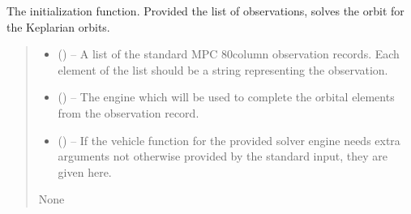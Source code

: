 \documentclass[letterpaper,11pt,english]{sphinxmanual}
\begin{document}
\begin{savenotes}
\begin{fulllineitems}
\begin{savenotes}\begin{fulllineitems}
\label{\detokenize{code/opihiexarata.orbit.solution:opihiexarata.orbit.solution.OrbitalSolution.__init__}}
\pysigstartsignatures
{}
\pysigstopsignatures
\sphinxAtStartPar
The initialization function. Provided the list of observations,
solves the orbit for the Keplarian orbits.
\begin{quote}\begin{description}
\begin{itemize}
\item {} 
\sphinxAtStartPar
{} () – A list of the standard MPC 80\sphinxhyphen{}column observation records. Each
element of the list should be a string representing the observation.

\item {} 
\sphinxAtStartPar
{} ({\hyperref[\detokenize{code/opihiexarata.library.engine:opihiexarata.library.engine.OrbitEngine}]{}}) – The engine which will be used to complete the orbital elements
from the observation record.

\item {} 
\sphinxAtStartPar
{} () – If the vehicle function for the provided solver engine needs
extra arguments not otherwise provided by the standard input,
they are given here.

\end{itemize}

\sphinxAtStartPar
None

\end{description}\end{quote}

\end{fulllineitems}\end{savenotes}


\end{fulllineitems}\end{savenotes}
\end{document}
